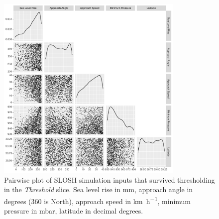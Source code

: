 \begin{figure}[tb]
    \centering
    \includegraphics[width=0.8\textwidth]{plots/threshold_pairs}
    \caption{Pairwise plot of SLOSH simulation inputs that survived thresholding in the 
        \emph{Threshold} slice.  Sea level rise in \unit{\mm}, approach angle 
        in degrees (360 is North), approach speed in \unit{\km\per\hour}, 
        minimum pressure in \unit{\milli\bar}, latitude in decimal degrees.
        \label{fig:thetahistogram}}
\end{figure}

